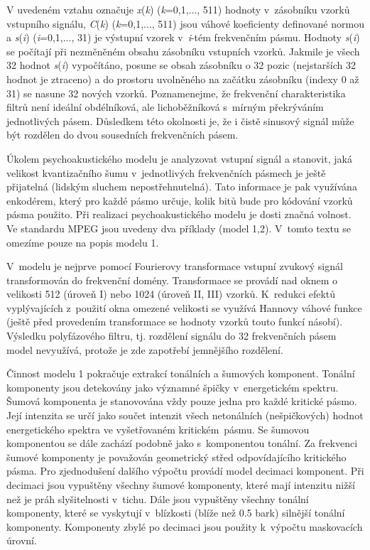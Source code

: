 \noindent V uvedeném vztahu označuje \textit{x}(\textit{k}) (\textit{k}=0,1,..., 511) hodnoty v~zásobníku vzorků vstupního signálu, \textit{C}(\textit{k}) (\textit{k}=0,1,..., 511) jsou váhové koeficienty definované normou a \textit{s}(\textit{i}) (\textit{i}=0,1,..., 31) je výstupní vzorek v~\textit{i}-tém frekvenčním pásmu. Hodnoty \textit{s}(\textit{i}) se počítají při nezměněném obsahu zásobníku vstupních vzorků. Jakmile je všech 32 hodnot \textit{s}(\textit{i}) vypočítáno, posune se obsah zásobníku o 32 pozic (nejstarších 32 hodnot je ztraceno) a do prostoru uvolněného na začátku zásobníku (indexy 0 až 31) se nasune 32 nových vzorků. Poznamenejme, že frekvenční charakteristika filtrů není ideální obdélníková, ale lichoběžníková s~mírným překrýváním jednotlivých pásem. Důsledkem této okolnosti je, že i čistě sinusový signál může být rozdělen do dvou sousedních frekvenčních pásem.

\noindent 

\noindent Úkolem psychoakustického modelu je analyzovat vstupní signál a stanovit, jaká velikost kvantizačního šumu v~jednotlivých frekvenčních pásmech je ještě přijatelná (lidským sluchem nepostřehnutelná). Tato informace je pak využívána enkodérem, který pro každé pásmo určuje, kolik bitů bude pro kódování vzorků pásma použito. Při realizaci psychoakustického modelu je dosti značná volnost. Ve standardu MPEG  jsou uvedeny dva příklady (model 1,2). V~tomto textu se omezíme pouze na popis modelu 1.

\noindent 

\noindent V~modelu je nejprve pomocí Fourierovy transformace vstupní zvukový signál transformován do frekvenční domény. Transformace se provádí nad oknem o velikosti 512 (úroveň I) nebo 1024 (úroveň II, III) vzorků. K~redukci efektů vyplývajících z~použití okna omezené velikosti se využívá Hannovy váhové funkce (ještě před provedením transformace se hodnoty vzorků touto funkcí násobí). Výsledku polyfázového filtru, tj. rozdělení signálu do 32 frekvenčních pásem model nevyužívá, protože je zde zapotřebí jemnějšího rozdělení.

\noindent 

\noindent Činnost modelu 1 pokračuje extrakcí tonálních a šumových komponent. Tonální komponenty jsou detekovány jako významné špičky v~energetickém spektru. Šumová komponenta je stanovována vždy pouze jedna pro každé kritické pásmo. Její intenzita se určí jako součet intenzit všech netonálních (nešpičkových) hodnot energetického spektra ve vyšetřovaném kritickém~pásmu. Se šumovou komponentou se dále zachází podobně jako s~komponentou tonální. Za frekvenci šumové komponenty je považován geometrický střed odpovídajícího kritického pásma. Pro zjednodušení dalšího výpočtu provádí model decimaci komponent. Při decimaci jsou vypuštěny všechny šumové komponenty, které mají intenzitu nižší než je práh slyšitelnosti v~tichu. Dále jsou vypuštěny všechny tonální komponenty, které se vyskytují v~blízkosti (blíže než 0.5 bark) silnější tonální komponenty. Komponenty zbylé po decimaci jsou použity k~výpočtu maskovacích úrovní.

